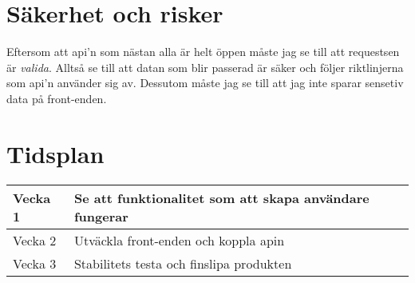 \documentclass{article}
\begin{document}
    \section{Säkerhet och risker}
        Eftersom att api'n som nästan alla är helt öppen måste jag se till att requestsen är \textit{valida}. Alltså se till att datan som blir passerad är säker och följer riktlinjerna som api'n använder sig av. Dessutom måste jag se till att jag inte sparar sensetiv data på front-enden.
    \section{Tidsplan}
       


      \begin{center}
        \begin{tabular}{ |p{1cm}|p{3cm}|} 

    
            \hline
            Vecka 1 & Se att funktionalitet som att skapa användare fungerar \\
            \hline
            Vecka 2 & Utväckla front-enden och koppla apin  \\ 
             \hline
            Vecka 3 & Stabilitets testa och finslipa produkten \\ 
            \hline
           \end{tabular}
      \end{center}
\end{document}
